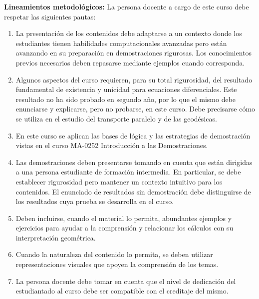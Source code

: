 \begin{refsection}
\noindent \textbf{Lineamientos metodológicos:} La persona docente a cargo de este curso debe respetar las siguientes pautas:
\begin{enumerate}
    \item La presentación de los contenidos debe adaptarse a un contexto donde los estudiantes tienen habilidades computacionales avanzadas pero están avanzando en su preparación en demostraciones rigurosas.  Los conocimientos previos necesarios deben repasarse mediante ejemplos cuando corresponda.
    \item Algunos aspectos del curso requieren, para su total rigurosidad, del resultado fundamental de existencia y unicidad para ecuaciones diferenciales. Este resultado no ha sido probado en segundo año, por lo que el mismo debe enunciarse y explicarse, pero no probarse, en este curso. Debe precisarse cómo se utiliza en el estudio del transporte paralelo y de las geodésicas.
    \item En este curso se aplican las bases de lógica y las estrategias de demostración vistas en el curso MA-0252 Introducción a las Demostraciones.
    \item Las demostraciones deben presentarse tomando en cuenta que están dirigidas a una persona estudiante de formación intermedia. En particular, se debe establecer rigurosidad pero mantener un contexto intuitivo para los contenidos. El enunciado de resultados sin demostración debe distinguirse de los resultados cuya prueba se desarrolla en el curso.
    \item Deben incluirse, cuando el material lo permita, abundantes ejemplos y ejercicios para ayudar a la comprensión y relacionar los cálculos con su interpretación geométrica.
    \item Cuando la naturaleza del contenido lo permita, se deben utilizar representaciones visuales que apoyen la comprensión de los temas.
    \item La persona docente debe tomar en cuenta que el nivel de dedicación del estudiantado al curso debe ser compatible con el creditaje del mismo.
\end{enumerate}


\end{refsection}
